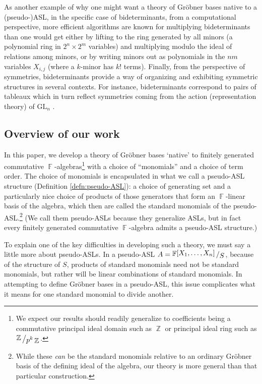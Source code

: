 \documentclass[11pt,reqno]{amsart}
\DeclareMathOperator{\Z}{\mathbb{Z}}
\DeclareMathOperator{\F}{\mathbb{F}}
\newcommand{\bigslant}[2]{{\raisebox{.2em}{$#1$}\left/\raisebox{-.2em}{$#2$}\right.}}
\newcommand{\gb}{Gr\"{o}bner }
\theoremstyle{definition}
\numberwithin{equation}{section}
\begin{document}
As another example of why one might want a theory of Gröbner bases native to a (pseudo-)ASL, in the specific case of bideterminants, from a computational perspective, more efficient algorithms are known for multiplying bideterminants \cite{ShaoLi, desarmenien1980algorithm, white} than one would get either by lifting to the ring generated by all minors (a polynomial ring in $2^n \times 2^m$ variables) and multiplying modulo the ideal of relations among minors, or by writing minors out as polynomials in the $nm$ variables $X_{i,j}$ (where a $k$-minor has $k!$ terms). Finally, from the perspective of symmetries, bideterminants provide a way of organizing and exhibiting symmetric structures in several contexts. For instance, bideterminants correspond to pairs of tableaux which in turn reflect symmetries coming from the action (representation theory) of $\mathrm{GL}_n$ \cite{DEPYoung}.

\subsection{Overview of our work}
In this paper, we develop a theory of \gb bases `native' to finitely generated commutative $\F$-algebras\footnote{We expect our results should readily generalize to coefficients being a commutative principal ideal domain such as $\Z$ or principal ideal ring such as $\bigslant{\Z}{p^k \Z}$.} with a choice of ``monomials'' and a choice of term order. The choice of monomials is encapsulated in what we call a pseudo-ASL structure (Definition \ref{defn:pseudo-ASL}): a choice of generating set and a particularly nice choice of products of those generators that form an $\F$-linear basis of the algebra, which then are called the standard monomials of the pseudo-ASL.\footnote{While these \emph{can} be the standard monomials relative to an ordinary Gröbner basis of the defining ideal of the algebra, our theory is more general than that particular construction.} (We call them pseudo-ASLs because they generalize ASLs, but in fact every finitely generated commutative $\F$-algebra admits a pseudo-ASL structure.)

To explain one of the key difficulties in developing such a theory, we must say a little more about pseudo-ASLs. In a pseudo-ASL $A=\bigslant{\F[X_1, \dotsc, X_n]}{S}$, because of the structure of $S$, products of standard monomials need not be standard monomials, but rather will be linear combinations of standard monomials. In attempting to define Gröbner bases in a pseudo-ASL, this issue complicates what it means for one standard monomial to divide another. 
\end{document}

